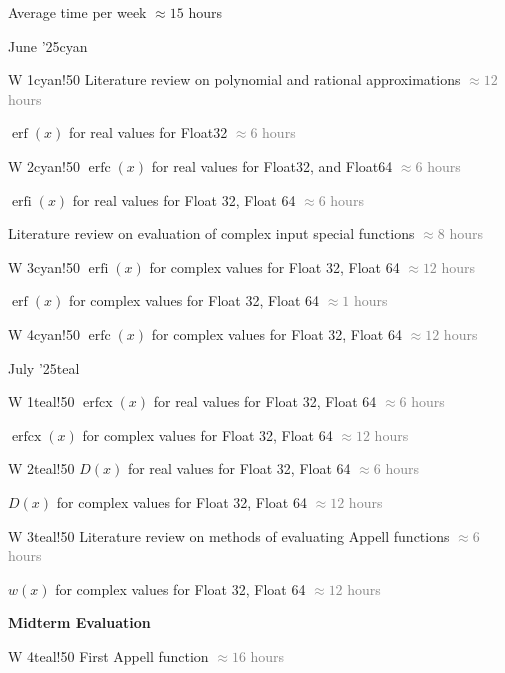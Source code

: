 \documentclass{article}
\newcommand{\release}[2]{%
        #1
        \hspace*{\fill}
        \textcolor{gray}{#2}\par}
\theoremstyle{mytheoremstyle}
\theoremstyle{mytheoremstyle}
\theoremstyle{myproblemstyle}
\begin{document}
      \noindent Average time per week $\approx 15 $ hours 
      \begin{releaseyear}{June '25}{cyan}
        \begin{releasequarter}{W 1}{cyan!50}
          \release{Literature review on polynomial and rational approximations}{$\approx 12$  hours}
          \release{$\operatorname{erf}(x)$ for real values for Float32 }{$\approx 6$  hours}
        \end{releasequarter}
        \begin{releasequarter}{W 2}{cyan!50}
          \release{$\operatorname{erfc}(x)$ for real values for Float32, and Float64}{$\approx 6$  hours}
          \release{$\operatorname{erfi}(x)$ for real values for Float 32, Float 64}{$\approx 6$  hours}
          \release{Literature review on evaluation of complex input special functions}{$\approx 8$  hours}

        \end{releasequarter}
        \begin{releasequarter}{W 3}{cyan!50}
          \release{$\operatorname{erfi}(x)$ for complex values for Float 32, Float 64}{$\approx 12$  hours}
          \release{$\operatorname{erf}(x)$ for complex values for Float 32, Float 64}{$\approx 1$  hours}
        \end{releasequarter}
        \begin{releasequarter}{W 4}{cyan!50}
          \release{$\operatorname{erfc}(x)$ for complex values for Float 32, Float 64}{$\approx 12$  hours}
        \end{releasequarter}
      \end{releaseyear}
      \begin{releaseyear}{July '25}{teal}
        \begin{releasequarter}{W 1}{teal!50}
          \release{$\operatorname{erfcx}(x)$ for real values for Float 32, Float 64}{$\approx 6$  hours}
          \release{$\operatorname{erfcx }(x)$ for complex values for Float 32, Float 64}{$\approx 12$  hours}
        \end{releasequarter}
        \begin{releasequarter}{W 2}{teal!50}
          \release{$D(x)$ for real values for Float 32, Float 64}{$\approx 6$  hours}
          \release{$D(x)$ for complex values for Float 32, Float 64}{$\approx 12$  hours}
        \end{releasequarter}
        \begin{releasequarter}{W 3}{teal!50}
          \release{Literature review on methods of evaluating Appell functions}{$\approx 6$  hours}
          \release{$w(x)$ for complex values for Float 32, Float 64}{$\approx 12$  hours}
          \release{\textbf{Midterm Evaluation}}{}
        \end{releasequarter}
        \begin{releasequarter}{W 4}{teal!50}
          \release{First Appell function}{$\approx 16$  hours}
        \end{releasequarter}
      \end{releaseyear}
\end{document}
